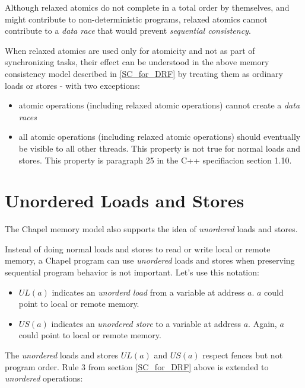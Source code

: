 Although relaxed atomics do not complete in a total order by themselves,
and might contribute to non-deterministic programs, relaxed atomics cannot
contribute to a \textit{data race} that would prevent \textit{sequential
consistency}.

When relaxed atomics are used only for atomicity and not as part of
synchronizing tasks, their effect can be understood in the above memory
consistency model described in \ref{SC_for_DRF} by treating them as
ordinary loads or stores - with two exceptions:

\begin{itemize}

\item atomic operations (including relaxed atomic operations) cannot
create a \textit{data races}

\item all atomic operations (including relaxed atomic operations) should
eventually be visible to all other threads. This property is not true for
normal loads and stores. This property is paragraph 25 in the C++
specifiacion section 1.10. 

\end{itemize}

\section{Unordered Loads and Stores}

The Chapel memory model also supports the idea of \textit{unordered} loads
and stores.

Instead of doing normal loads and stores to read or write local or remote
memory, a Chapel program can use \textit{unordered} loads and stores when
preserving sequential program behavior is not important. Let's use this
notation:

\begin{itemize}

  \item $UL(a)$ indicates an \textit{unorderd} \textit{load} from a
  variable at address $a$. $a$ could point to local or remote memory.

  \item $US(a)$ indicates an \textit{unordered} \textit{store} to a
  variable at address $a$. Again, $a$ could point to local or remote
  memory.

\end{itemize}

The \textit{unordered} loads and stores $UL(a)$ and $US(a)$ respect fences
but not program order. Rule 3 from section \ref{SC_for_DRF} above is
extended to \textit{unordered} operations:

